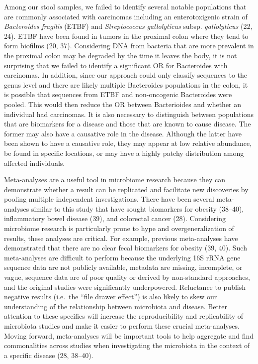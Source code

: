 \documentclass[12pt,]{article}
\begin{document}
Among our stool samples, we failed to identify several notable
populations that are commonly associated with carcinomas including an
enterotoxigenic strain of \emph{Bacteroides fragilis} (ETBF) and
\emph{Streptococcus gallolyticus} subsp. \emph{gallolyticus} (22, 24).
ETBF have been found in tumors in the proximal colon where they tend to
form biofilms (20, 37). Considering DNA from bacteria that are more
prevalent in the proximal colon may be degraded by the time it leaves
the body, it is not surprising that we failed to identify a significant
OR for Bacteroides with carcinomas. In addition, since our approach
could only classify sequences to the genus level and there are likely
multiple Bacteroides populations in the colon, it is possible that
sequences from ETBF and non-oncogenic Bacteroides were pooled. This
would then reduce the OR between Bacterioides and whether an individual
had carcinomas. It is also necessary to distinguish between populations
that are biomarkers for a disease and those that are known to cause
disease. The former may also have a causative role in the disease.
Although the latter have been shown to have a causative role, they may
appear at low relative abundance, be found in specific locations, or may
have a highly patchy distribution among affected individuals.

Meta-analyses are a useful tool in microbiome research because they can
demonstrate whether a result can be replicated and facilitate new
discoveries by pooling multiple independent investigations. There have
been several meta-analyses similar to this study that have sought
biomarkers for obesity (38--40), inflammatory bowel disease (39), and
colorectal cancer (28). Considering microbiome research is particularly
prone to hype and overgeneralization of results, these analyses are
critical. For example, previous meta-analyses have demonstrated that
there are no clear fecal biomarkers for obesity (39, 40). Such
meta-analyses are difficult to perform because the underlying 16S rRNA
gene sequence data are not publicly available, metadata are missing,
incomplete, or vague, sequence data are of poor quality or derived by
non-standard approaches, and the original studies were significantly
underpowered. Reluctance to publish negative results (i.e.~the ``file
drawer effect'') is also likely to skew our understanding of the
relationship between microbiota and disease. Better attention to these
specifics will increase the reproducibility and replicability of
microbiota studies and make it easier to perform these crucial
meta-analyses. Moving forward, meta-analyses will be important tools to
help aggregate and find commonalities across studies when investigating
the microbiota in the context of a specific disease (28, 38--40).
\end{document}

